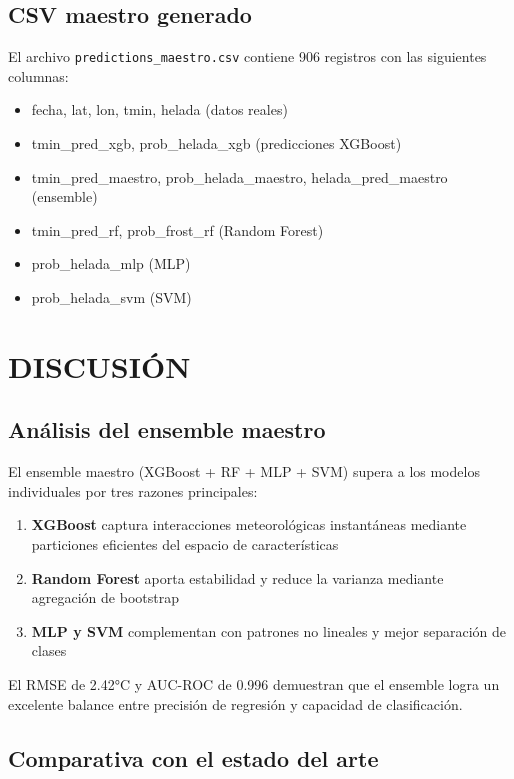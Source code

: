 \documentclass[11pt, a4paper]{article}
\begin{document}
\subsection{CSV maestro generado}

El archivo \texttt{predictions\_maestro.csv} contiene 906 registros con las siguientes columnas:
\begin{itemize}
    \item fecha, lat, lon, tmin, helada (datos reales)
    \item tmin\_pred\_xgb, prob\_helada\_xgb (predicciones XGBoost)
    \item tmin\_pred\_maestro, prob\_helada\_maestro, helada\_pred\_maestro (ensemble)
    \item tmin\_pred\_rf, prob\_frost\_rf (Random Forest)
    \item prob\_helada\_mlp (MLP)
    \item prob\_helada\_svm (SVM)
\end{itemize}

\section{DISCUSIÓN}

\subsection{Análisis del ensemble maestro}

El ensemble maestro (XGBoost + RF + MLP + SVM) supera a los modelos individuales por tres razones principales:

\begin{enumerate}
    \item \textbf{XGBoost} captura interacciones meteorológicas instantáneas mediante particiones eficientes del espacio de características
    \item \textbf{Random Forest} aporta estabilidad y reduce la varianza mediante agregación de bootstrap
    \item \textbf{MLP y SVM} complementan con patrones no lineales y mejor separación de clases
\end{enumerate}

El RMSE de 2.42°C y AUC-ROC de 0.996 demuestran que el ensemble logra un excelente balance entre precisión de regresión y capacidad de clasificación.

\subsection{Comparativa con el estado del arte}
\end{document}
